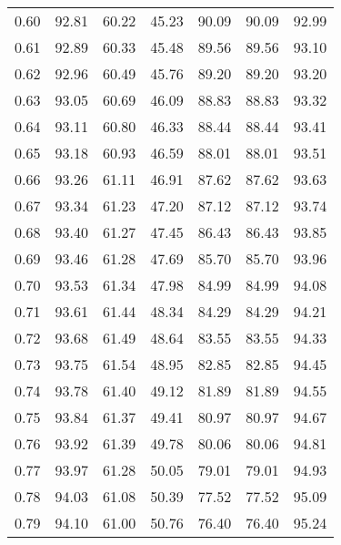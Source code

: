 \begin{tabular}{|c|c|c|c|c|c|c|}
      0.60 &     92.81 &     60.22 &      45.23 &   90.09 &      90.09 &         92.99 \\
      0.61 &     92.89 &     60.33 &      45.48 &   89.56 &      89.56 &         93.10 \\
      0.62 &     92.96 &     60.49 &      45.76 &   89.20 &      89.20 &         93.20 \\
      0.63 &     93.05 &     60.69 &      46.09 &   88.83 &      88.83 &         93.32 \\
      0.64 &     93.11 &     60.80 &      46.33 &   88.44 &      88.44 &         93.41 \\
      0.65 &     93.18 &     60.93 &      46.59 &   88.01 &      88.01 &         93.51 \\
      0.66 &     93.26 &     61.11 &      46.91 &   87.62 &      87.62 &         93.63 \\
      0.67 &     93.34 &     61.23 &      47.20 &   87.12 &      87.12 &         93.74 \\
      0.68 &     93.40 &     61.27 &      47.45 &   86.43 &      86.43 &         93.85 \\
      0.69 &     93.46 &     61.28 &      47.69 &   85.70 &      85.70 &         93.96 \\
      0.70 &     93.53 &     61.34 &      47.98 &   84.99 &      84.99 &         94.08 \\
      0.71 &     93.61 &     61.44 &      48.34 &   84.29 &      84.29 &         94.21 \\
      0.72 &     93.68 &     61.49 &      48.64 &   83.55 &      83.55 &         94.33 \\
      0.73 &     93.75 &     61.54 &      48.95 &   82.85 &      82.85 &         94.45 \\
      0.74 &     93.78 &     61.40 &      49.12 &   81.89 &      81.89 &         94.55 \\
      0.75 &     93.84 &     61.37 &      49.41 &   80.97 &      80.97 &         94.67 \\
      0.76 &     93.92 &     61.39 &      49.78 &   80.06 &      80.06 &         94.81 \\
      0.77 &     93.97 &     61.28 &      50.05 &   79.01 &      79.01 &         94.93 \\
      0.78 &     94.03 &     61.08 &      50.39 &   77.52 &      77.52 &         95.09 \\
      0.79 &     94.10 &     61.00 &      50.76 &   76.40 &      76.40 &         95.24 \\

\end{tabular}
